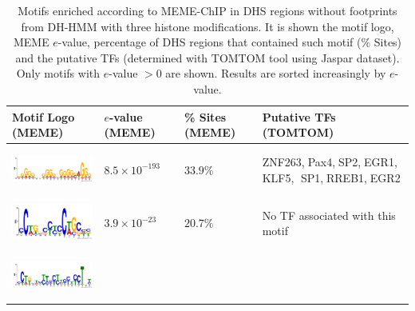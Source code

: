 \documentclass{bioinfo}
\begin{document}
\begin{table}[t]
\begin{center}
\caption{{\color{black} Motifs enriched according to MEME-ChIP in DHS regions without footprints from DH-HMM with three histone modifications. It is shown the motif logo, MEME $e$-value, percentage of DHS regions that contained such motif (\% Sites) and the putative TFs (determined with TOMTOM tool using Jaspar dataset). Only motifs with $e$-value $> 0$ are shown. Results are sorted increasingly by $e$-value.}}
\label{tab:meme.enrichment}
\renewcommand{\arraystretch}{1.2}
    \begin{tabular}{>{\raggedright\arraybackslash} m{5.6cm}
                    >{\centering\arraybackslash} m{2.0cm}
                    >{\centering\arraybackslash} m{1.5cm}
                    >{\centering\arraybackslash} m{6.0cm}}
    \hline
    \textbf{Motif Logo (MEME)} & \textbf{$e$-value (MEME)} & \textbf{\% Sites (MEME)} & \textbf{Putative TFs (TOMTOM)} \\
    \hline
    \begin{minipage}{.32\textwidth}
      \includegraphics[width=\linewidth, height=15mm]{Figs/MEME_HMM3_logo1}
    \end{minipage}
    & $8.5 \times 10^{-193}$ & $33.9\%$ & ZNF263,$\;$Pax4,$\;$SP2,$\;$EGR1,$\;$KLF5,$\;$ SP1,$\;$RREB1,$\;$EGR2 \\
    \hline
    \begin{minipage}{.235\textwidth}
      \includegraphics[width=\linewidth, height=15mm]{Figs/MEME_HMM3_logo2}
    \end{minipage}
    & $3.9 \times 10^{-23}$ & $20.7\%$ & No TF associated with this motif \\
    \hline
    \begin{minipage}{.32\textwidth}
      \includegraphics[width=\linewidth, height=15mm]{Figs/MEME_HMM3_logo5}
    \end{minipage}

\end{tabular}
\end{center}
\end{table}
\end{document}
